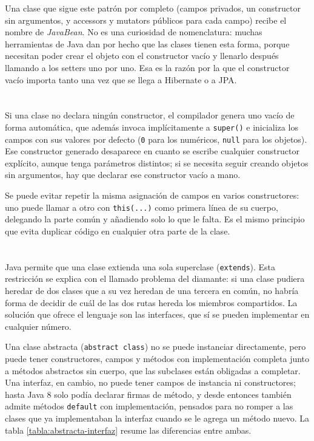 \documentclass[10pt,a4paper]{article}
\begin{document}
Una clase que sigue este patrón por completo (campos privados, un constructor sin argumentos, y accessors y mutators públicos para cada campo) recibe el nombre de \textit{JavaBean}. No es una curiosidad de nomenclatura: muchas herramientas de Java dan por hecho que las clases tienen esta forma, porque necesitan poder crear el objeto con el constructor vacío y llenarlo después llamando a los setters uno por uno. Esa es la razón por la que el constructor vacío importa tanto una vez que se llega a Hibernate o a JPA.

\section{\color{colorIPN}{Constructores}}

Si una clase no declara ningún constructor, el compilador genera uno vacío de forma automática, que además invoca implícitamente a \texttt{super()} e inicializa los campos con sus valores por defecto (\texttt{0} para los numéricos, \texttt{null} para los objetos). Ese constructor generado desaparece en cuanto se escribe cualquier constructor explícito, aunque tenga parámetros distintos; si se necesita seguir creando objetos sin argumentos, hay que declarar ese constructor vacío a mano.

Se puede evitar repetir la misma asignación de campos en varios constructores: uno puede llamar a otro con \texttt{this(...)} como primera línea de su cuerpo, delegando la parte común y añadiendo solo lo que le falta. Es el mismo principio que evita duplicar código en cualquier otra parte de la clase.

\section{\color{colorIPN}{Herencia, clases abstractas e interfaces}}

Java permite que una clase extienda una sola superclase (\texttt{extends}). Esta restricción se explica con el llamado problema del diamante: si una clase pudiera heredar de dos clases que a su vez heredan de una tercera en común, no habría forma de decidir de cuál de las dos rutas hereda los miembros compartidos. La solución que ofrece el lenguaje son las interfaces, que sí se pueden implementar en cualquier número.

Una clase abstracta (\texttt{abstract class}) no se puede instanciar directamente, pero puede tener constructores, campos y métodos con implementación completa junto a métodos abstractos sin cuerpo, que las subclases están obligadas a completar. Una interfaz, en cambio, no puede tener campos de instancia ni constructores; hasta Java 8 solo podía declarar firmas de método, y desde entonces también admite métodos \texttt{default} con implementación, pensados para no romper a las clases que ya implementaban la interfaz cuando se le agrega un método nuevo. La tabla \ref{tabla:abstracta-interfaz} resume las diferencias entre ambas.
\end{document}
